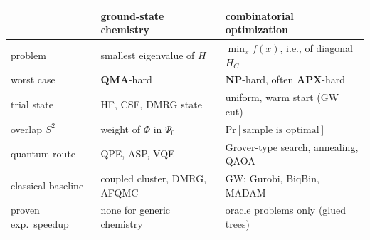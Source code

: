 \documentclass[handoutsbeamer.tex]{subfiles}
\begin{document}
\begin{frame}
\begin{center}\ona{\small}\onp{\scriptsize}
\begin{tabular}{lll}\toprule
 & ground-state chemistry & combinatorial optimization \\\midrule
problem & smallest eigenvalue of $H$ & $\min_x f(x)$, i.e., of diagonal $H_C$ \\
worst case & $\mathbf{QMA}$-hard & $\mathbf{NP}$-hard, often $\mathbf{APX}$-hard \\
trial state & HF, CSF, DMRG state & uniform, warm start (GW cut) \\
overlap $S^2$ & weight of $\Phi$ in $\Psi_0$ & $\mathrm{Pr}[\text{sample is optimal}]$ \\
quantum route & QPE, ASP, VQE & Grover-type search, annealing, QAOA \\
classical baseline & coupled cluster, DMRG, AFQMC & GW; Gurobi, BiqBin, MADAM \\
proven exp.\ speedup & none for generic chemistry & oracle problems only (glued trees) \\\bottomrule
\end{tabular}
\end{center}
\end{frame}
\end{document}

